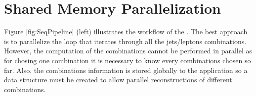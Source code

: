 \section{Shared Memory Parallelization}
\label{Parallelization:SharedMem}

Figure \ref{fig:SeqPipeline} (left) illustrates the workflow of the \ttDilepKinFit. The best approach is to parallelize the loop that iterates through all the jets/leptons combinations. However, the computation of the combinations cannot be performed in parallel as for chosing one combination it is necessary to know every combinations chosen so far. Also, the combinations information is stored globally to the application so a data structure must be created to allow parallel reconstructions of different combinations.

